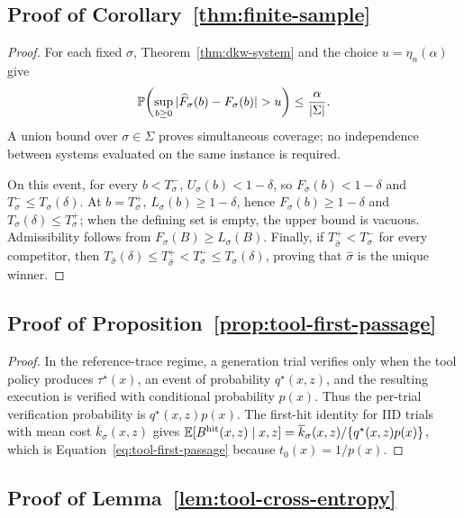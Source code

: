 \subsection{Proof of Corollary~\ref{thm:finite-sample}}

\begin{proof}
For each fixed \(\sigma\), Theorem~\ref{thm:dkw-system} and the choice
\(u=\eta_n(\alpha)\) give
\[
\Prob\!\left(
\sup_{b\ge0}|\widehat F_\sigma(b)-F_\sigma(b)|>u
\right)
\le\frac{\alpha}{|\Sigma|}.
\]
A union bound over \(\sigma\in\Sigma\) proves simultaneous coverage; no
independence between systems evaluated on the same instance is required.

On this event, for every \(b<T_\sigma^-\), \(U_\sigma(b)<1-\delta\), so
\(F_\sigma(b)<1-\delta\) and \(T_\sigma^-\le T_\sigma(\delta)\).  At
\(b=T_\sigma^+\), \(L_\sigma(b)\ge1-\delta\), hence
\(F_\sigma(b)\ge1-\delta\) and
\(T_\sigma(\delta)\le T_\sigma^+\); when the defining set is empty, the upper
bound is vacuous.  Admissibility follows from
\(F_\sigma(B)\ge L_\sigma(B)\).  Finally, if
\(T_{\widehat\sigma}^+<T_\sigma^-\) for every competitor, then
\(T_{\widehat\sigma}(\delta)\le T_{\widehat\sigma}^+
<T_\sigma^-\le T_\sigma(\delta)\), proving that \(\widehat\sigma\) is the
unique winner.
\end{proof}

\subsection{Proof of Proposition~\ref{prop:tool-first-passage}}

\begin{proof}
In the reference-trace regime, a generation trial verifies only when the tool
policy produces \(\tau^\star(x)\), an event of probability \(q^\star(x,z)\), and
the resulting execution is verified with conditional probability \(p(x)\).
Thus the per-trial verification probability is \(q^\star(x,z)p(x)\).  The
first-hit identity for IID trials with mean cost \(\overline k_\sigma(x,z)\)
gives
\(\mathbb{E}[B^{\mathrm{hit}}(x,z)\mid x,z]
=\overline k_\sigma(x,z)/\{q^\star(x,z)p(x)\}\), which is
Equation~\eqref{eq:tool-first-passage} because \(t_0(x)=1/p(x)\).
\end{proof}

\subsection{Proof of Lemma~\ref{lem:tool-cross-entropy}}

